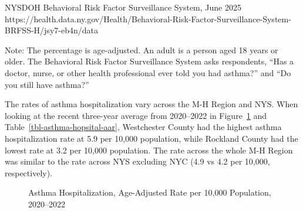 \documentclass[
  english,
  letterpaper,
]{report}
\begin{document}
\begin{tcolorbox}[enhanced jigsaw, breakable, leftrule=.75mm, title=\textcolor{quarto-callout-note-color}{\faInfo}\hspace{0.5em}{Source}, bottomrule=.15mm, opacityback=0, left=2mm, colback=white, bottomtitle=1mm, coltitle=black, colbacktitle=quarto-callout-note-color!10!white, colframe=quarto-callout-note-color-frame, opacitybacktitle=0.6, toptitle=1mm, titlerule=0mm, arc=.35mm, rightrule=.15mm, toprule=.15mm]

NYSDOH Behavioral Risk Factor Surveillance System, June 2025
https://health.data.ny.gov/Health/Behavioral-Risk-Factor-Surveillance-System-BRFSS-H/jsy7-eb4n/data

\end{tcolorbox}

\begin{tcolorbox}[enhanced jigsaw, breakable, leftrule=.75mm, title=\textcolor{quarto-callout-note-color}{\faInfo}\hspace{0.5em}{Note}, bottomrule=.15mm, opacityback=0, left=2mm, colback=white, bottomtitle=1mm, coltitle=black, colbacktitle=quarto-callout-note-color!10!white, colframe=quarto-callout-note-color-frame, opacitybacktitle=0.6, toptitle=1mm, titlerule=0mm, arc=.35mm, rightrule=.15mm, toprule=.15mm]

Note: The percentage is age-adjusted. An adult is a person aged 18 years
or older. The Behavioral Risk Factor Surveillance System asks
respondents, ``Has a doctor, nurse, or other health professional ever
told you had asthma?'' and ``Do you still have asthma?''

\end{tcolorbox}

The rates of asthma hospitalization vary across the M-H Region and NYS.
When looking at the recent three-year average from 2020--2022 in
Figure~\ref{fig-asthma-hopsital-aar} and
Table~\ref{tbl-asthma-hopsital-aar}, Westchester County had the highest
asthma hospitalization rate at 5.9 per 10,000 population, while Rockland
County had the lowest rate at 3.2 per 10,000 population. The rate across
the whole M-H Region was similar to the rate across NYS excluding NYC
(4.9 vs 4.2 per 10,000, respectively).

\begin{figure}


\caption{\label{fig-asthma-hopsital-aar}Asthma Hospitalization,
Age-Adjusted Rate per 10,000 Population, 2020--2022}

\end{figure}%
\end{document}
